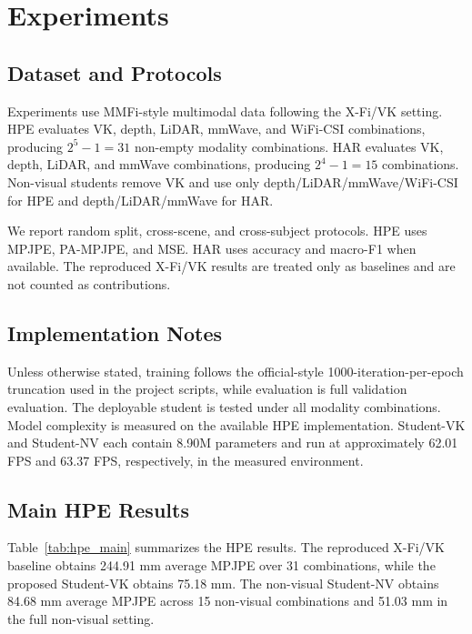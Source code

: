 \documentclass[journal]{IEEEtran}
\newcommand{\mpjpe}{MPJPE}
\newcommand{\pampjpe}{PA-MPJPE}
\begin{document}
\section{Experiments}

\subsection{Dataset and Protocols}

Experiments use MMFi-style multimodal data following the X-Fi/VK setting. HPE evaluates VK, depth, LiDAR, mmWave, and WiFi-CSI combinations, producing $2^5-1=31$ non-empty modality combinations. HAR evaluates VK, depth, LiDAR, and mmWave combinations, producing $2^4-1=15$ combinations. Non-visual students remove VK and use only depth/LiDAR/mmWave/WiFi-CSI for HPE and depth/LiDAR/mmWave for HAR.

We report random split, cross-scene, and cross-subject protocols. HPE uses \mpjpe{}, \pampjpe{}, and MSE. HAR uses accuracy and macro-F1 when available. The reproduced X-Fi/VK results are treated only as baselines and are not counted as contributions.

\subsection{Implementation Notes}

Unless otherwise stated, training follows the official-style 1000-iteration-per-epoch truncation used in the project scripts, while evaluation is full validation evaluation. The deployable student is tested under all modality combinations. Model complexity is measured on the available HPE implementation. Student-VK and Student-NV each contain 8.90M parameters and run at approximately 62.01 FPS and 63.37 FPS, respectively, in the measured environment.

\subsection{Main HPE Results}

Table~\ref{tab:hpe_main} summarizes the HPE results. The reproduced X-Fi/VK baseline obtains 244.91 mm average \mpjpe{} over 31 combinations, while the proposed Student-VK obtains 75.18 mm. The non-visual Student-NV obtains 84.68 mm average \mpjpe{} across 15 non-visual combinations and 51.03 mm in the full non-visual setting.
\end{document}
